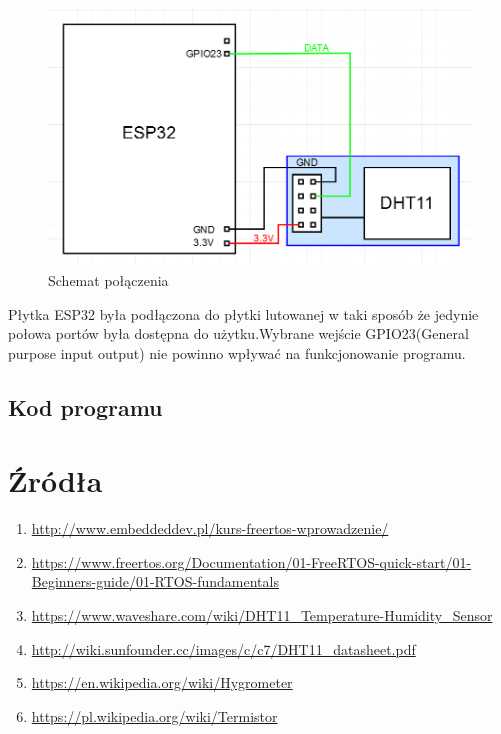 \documentclass{article}
\begin{document}
            \FloatBarrier
            \begin{figure}[ht]
                \centering
                \includegraphics[width=\textwidth]{images/Zrzut ekranu 2025-01-27 003805.png}
                \caption{Schemat połączenia}
                \label{fig:schema}
            \end{figure}
            \FloatBarrier
            Płytka ESP32 była podłączona do płytki lutowanej w taki sposób że jedynie połowa portów
            była dostępna do użytku.Wybrane wejście GPIO23(General purpose input output) nie powinno 
            wpływać na funkcjonowanie programu.
        \subsection{Kod programu}
    \section{Źródła}
        \begin{enumerate}[label=\arabic*.]
            \item \url{http://www.embeddeddev.pl/kurs-freertos-wprowadzenie/}
            \item \url{https://www.freertos.org/Documentation/01-FreeRTOS-quick-start/01-Beginners-guide/01-RTOS-fundamentals}
            \item \url{https://www.waveshare.com/wiki/DHT11_Temperature-Humidity_Sensor}
            \item \url{http://wiki.sunfounder.cc/images/c/c7/DHT11_datasheet.pdf} \label{src:datasheet}
            \item \url{https://en.wikipedia.org/wiki/Hygrometer}
            \item \url{https://pl.wikipedia.org/wiki/Termistor}
        \end{enumerate}
\end{document}
